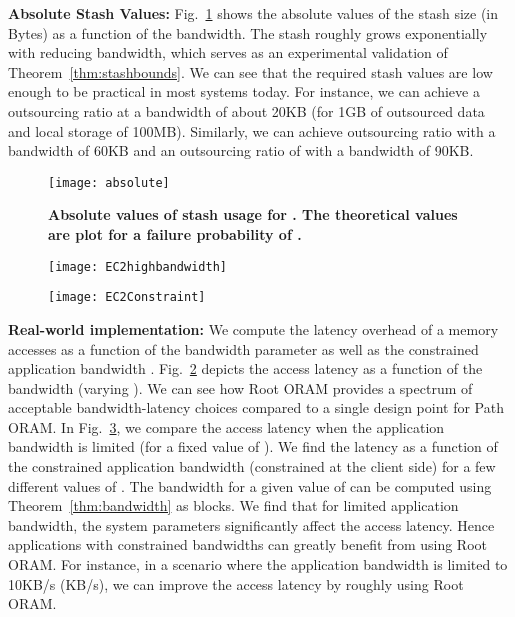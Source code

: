 \documentclass[USenglish,oneside,twocolumn]{article}
\newcommand{\ourprotocol}{Root ORAM}
\begin{document}
\textbf{Absolute Stash Values: } Fig.~\ref{fig:stash} shows the absolute values of the stash size (in Bytes) as a function of the bandwidth. The stash roughly grows exponentially with reducing bandwidth, which serves as an experimental validation of Theorem~\ref{thm:stashbounds}. We can see that the required stash values are low enough to be practical in most systems today. For instance, we can achieve a  outsourcing ratio at a bandwidth of about 20KB (for 1GB of outsourced data and local storage of 100MB). Similarly, we can achieve  outsourcing ratio with a bandwidth of 60KB and an outsourcing ratio of  with a bandwidth of 90KB.


\begin{figure}[!tp]
\centering
\texttt{[image: absolute]}
\caption{\textbf{Absolute values of stash usage for . The theoretical values are plot for a failure probability of .}}
\label{fig:stash}
\end{figure}


\begin{figure*}[!htp]
\centering
\begin{subfigure}[b]{.47\textwidth}
\centering
\texttt{[image: EC2highbandwidth]}
\caption{}\label{ec2latency}
\end{subfigure}\qquad
\begin{subfigure}[b]{.47\textwidth}
\centering
\texttt{[image: EC2Constraint]}
\caption{}\label{ec2constraint}
\end{subfigure}
\vspace{-10pt}
\caption{\textbf{Real-world implementations over Amazon EC2. Fig.~\ref{ec2latency} shows the \ourprotocol{} latency as a function of the bandwidth for  and different block sizes viz.,  KB,  KB and  KB. Fig.~\ref{ec2constraint} shows the latency as a function of the constrained/limited application bandwidth for  KB block sizes and . Note the significant difference between the access latency across different  values for constrained bandwidth applications.}}\label{fig:EC2}
\end{figure*}

\textbf{Real-world implementation: } We compute the latency overhead of a memory accesses as a function of the bandwidth parameter  as well as the constrained application bandwidth .
Fig.~\ref{ec2latency} depicts the access latency as a function of the bandwidth (varying ). We can see how \ourprotocol{} provides a spectrum of acceptable bandwidth-latency choices compared to a single design point for Path ORAM. In Fig.~\ref{ec2constraint}, we compare the access latency when the application bandwidth is limited (for a fixed value of ). We find the latency as a function of the constrained application bandwidth  (constrained at the client side) for a few different values of . The bandwidth for a given value of  can be computed using Theorem~\ref{thm:bandwidth} as  blocks. We find that for limited application bandwidth, the system parameters significantly affect the access latency. Hence applications with constrained bandwidths can greatly benefit from using \ourprotocol{}. For instance, in a scenario where the application bandwidth is limited to  10KB/s (KB/s), we can improve the access latency by roughly  using \ourprotocol{}.
\end{document}
